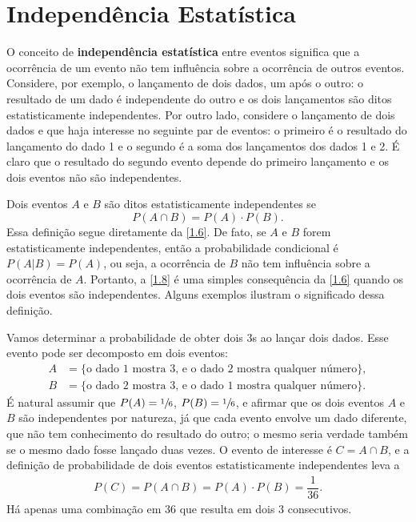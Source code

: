 \section{Independência Estatística}

O conceito de \textbf{independência estatística} entre eventos significa que a ocorrência de um evento não tem influência sobre a ocorrência de outros eventos. Considere, por exemplo, o lançamento de dois dados, um após o outro: o resultado de um dado é independente do outro e os dois lançamentos são ditos estatisticamente independentes. Por outro lado, considere o lançamento de dois dados e que haja interesse no seguinte par de eventos: o primeiro é o resultado do lançamento do dado 1 e o segundo é a soma dos lançamentos dos dados 1 e 2. É claro que o resultado do segundo evento depende do primeiro lançamento e os dois eventos não são independentes.

Dois eventos $A$ e $B$ são ditos estatisticamente independentes se
\begin{equation}\label{1.8}
P(A \cap B) = P(A) \cdot P(B).
\end{equation}
Essa definição segue diretamente da \autoref{1.6}. De fato, se $A$ e $B$ forem estatisticamente independentes, então a probabilidade condicional é $P(A|B) = P(A)$, ou seja, a ocorrência de $B$ não tem influência sobre a ocorrência de $A$. Portanto, a \autoref{1.8} é uma simples consequência da \autoref{1.6} quando os dois eventos são independentes. Alguns exemplos ilustram o significado dessa definição.

\begin{exemplo}{}{}
Vamos determinar a probabilidade de obter dois $3$s ao lançar dois dados. Esse evento pode ser decomposto em dois eventos:
\begin{align*}
	A &= \{ \text{o dado 1 mostra 3, e o dado 2 mostra qualquer número} \}, \\
	B &= \{ \text{o dado 2 mostra 3, e o dado 1 mostra qualquer número} \}.
\end{align*}
É natural assumir que $P(A) = \sfrac{1}{6}$, $P(B) = \sfrac{1}{6}$, e afirmar que os dois eventos $A$ e $B$ são independentes por natureza, já que cada evento envolve um dado diferente, que não tem conhecimento do resultado do outro; o mesmo seria verdade também se o mesmo dado fosse lançado duas vezes. O evento de interesse é $C = A \cap B$, e a definição de probabilidade de dois eventos estatisticamente independentes leva a
\begin{align*}
	P(C) = P(A \cap B) = P(A) \cdot P(B) = \dfrac{1}{36}.
\end{align*}
Há apenas uma combinação em 36 que resulta em dois 3 consecutivos.
\end{exemplo}

